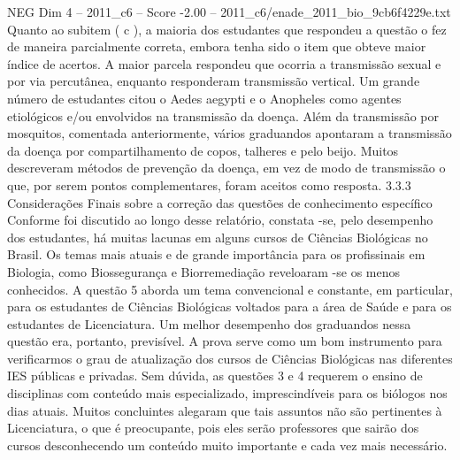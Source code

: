 \begin{textsample}{NEG Dim 4 – 2011\_c6 – Score -2.00 – 2011\_c6/enade\_2011\_bio\_9cb6f4229e.txt}
Quanto ao subitem ( c ), a maioria dos estudantes que respondeu a questão o fez de maneira parcialmente correta, embora tenha sido o item que obteve maior índice de acertos.
A maior parcela respondeu que ocorria a transmissão sexual e por via percutânea, enquanto responderam transmissão vertical.
Um grande número de estudantes citou o Aedes aegypti e o Anopheles como agentes etiológicos e/ou envolvidos na transmissão da doença.
Além da transmissão por mosquitos, comentada anteriormente, vários graduandos apontaram a transmissão da doença por compartilhamento de copos, talheres e pelo beijo.
Muitos descreveram métodos de prevenção da doença, em vez de modo de transmissão o que, por serem pontos complementares, foram aceitos como resposta. 3.3.3 Considerações Finais sobre a correção das questões de conhecimento específico Conforme foi discutido ao longo desse relatório, constata -se, pelo desempenho dos estudantes, há muitas lacunas em alguns cursos de Ciências Biológicas no Brasil.
Os temas mais atuais e de grande importância para os profissinais em Biologia, como Biossegurança e Biorremediação reveloaram -se os menos conhecidos.
A questão 5 aborda um tema convencional e constante, em particular, para os estudantes de Ciências Biológicas voltados para a área de Saúde e para os estudantes de Licenciatura.
Um melhor desempenho dos graduandos nessa questão era, portanto, previsível.
A prova serve como um bom instrumento para verificarmos o grau de atualização dos cursos de Ciências Biológicas nas diferentes IES públicas e privadas.
Sem dúvida, as questões 3 e 4 requerem o ensino de disciplinas com conteúdo mais especializado, imprescindíveis para os biólogos nos dias atuais.
Muitos concluintes alegaram que tais assuntos não são pertinentes à Licenciatura, o que é preocupante, pois eles serão professores que sairão dos cursos desconhecendo um conteúdo muito importante e cada vez mais necessário.

\end{textsample}
